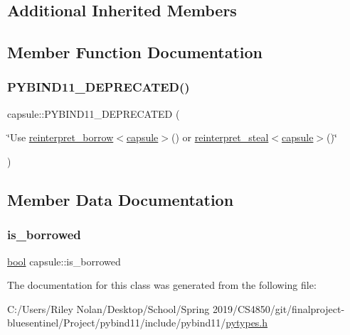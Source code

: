 \subsection*{Additional Inherited Members}


\subsection{Member Function Documentation}
\mbox{\label{classcapsule_a461da1cc0a43114173609990128e23d4}} 
\subsubsection{\texorpdfstring{PYBIND11\_DEPRECATED()}{PYBIND11\_DEPRECATED()}}
{\footnotesize\ttfamily capsule\+::\+P\+Y\+B\+I\+N\+D11\+\_\+\+D\+E\+P\+R\+E\+C\+A\+T\+ED (\begin{DoxyParamCaption}\item[{\char`\"{}Use \mbox{\hyperlink{classobject_ac1ea1a4cbcf197d7c8096037633720d7}{reinterpret\+\_\+borrow}}$<$\mbox{\hyperlink{classcapsule}{capsule}}$>$() or \mbox{\hyperlink{classobject_ae1de2ab5a755c10582ac1e46071de5c5}{reinterpret\+\_\+steal}}$<$\mbox{\hyperlink{classcapsule}{capsule}}$>$()\char`\"{}}]{ }\end{DoxyParamCaption})}



\subsection{Member Data Documentation}
\mbox{\label{classcapsule_a95816c90b9bf7ed133bd05c1f59a84e4}} 
\subsubsection{\texorpdfstring{is\_borrowed}{is\_borrowed}}
{\footnotesize\ttfamily \mbox{\hyperlink{asdl_8h_af6a258d8f3ee5206d682d799316314b1}{bool}} capsule\+::is\+\_\+borrowed}



The documentation for this class was generated from the following file\+:\begin{DoxyCompactItemize}
\item 
C\+:/\+Users/\+Riley Nolan/\+Desktop/\+School/\+Spring 2019/\+C\+S4850/git/finalproject-\/bluesentinel/\+Project/pybind11/include/pybind11/\mbox{\hyperlink{pytypes_8h}{pytypes.\+h}}\end{DoxyCompactItemize}
